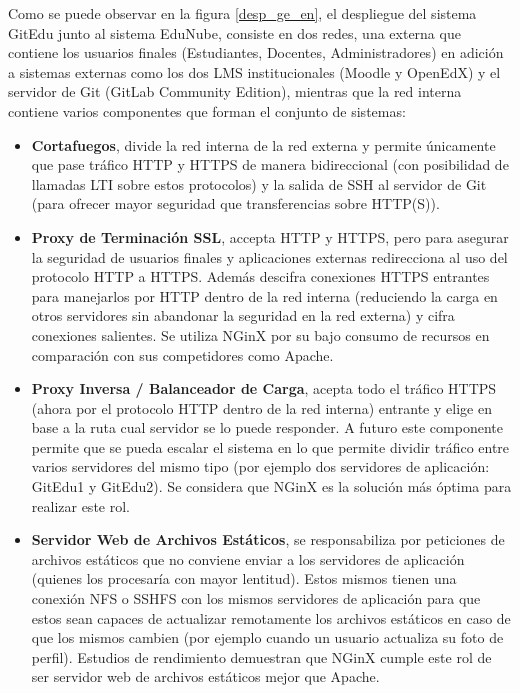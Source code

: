 Como se puede observar en la figura \ref{desp_ge_en}, el despliegue del sistema GitEdu junto al sistema EduNube, consiste en dos redes, una externa que contiene los usuarios finales (Estudiantes, Docentes, Administradores) en adición a sistemas externas como los dos LMS  institucionales (Moodle y OpenEdX) y el servidor de Git (GitLab Community Edition), mientras que la red interna contiene varios componentes que forman el conjunto de sistemas:
\begin{itemize}
	\item \textbf{Cortafuegos}, divide la red interna de la red externa y permite únicamente que pase tráfico HTTP y HTTPS de manera bidireccional (con posibilidad de llamadas LTI  sobre estos protocolos) y la salida de SSH al servidor de Git (para ofrecer mayor seguridad que transferencias sobre HTTP(S)).
    \item \textbf{Proxy de Terminación SSL}, accepta HTTP y HTTPS, pero para asegurar la seguridad de usuarios finales y aplicaciones externas redirecciona al uso del protocolo HTTP a HTTPS. Además descifra conexiones HTTPS entrantes para manejarlos por HTTP dentro de la red interna (reduciendo la carga en otros servidores sin abandonar la seguridad en la red externa) y cifra conexiones salientes. Se utiliza NGinX por su bajo consumo de recursos en comparación con sus competidores como Apache.
    \item \textbf{Proxy Inversa / Balanceador de Carga}, acepta todo el tráfico HTTPS (ahora por el protocolo HTTP dentro de la red interna) entrante y elige en base a la ruta cual servidor se lo puede responder. A futuro este componente permite que se pueda escalar el sistema en lo que permite dividir tráfico entre varios servidores del mismo tipo (por ejemplo dos servidores de aplicación: GitEdu1 y GitEdu2). Se considera que NGinX es la solución más óptima para realizar este rol.
    \item \textbf{Servidor Web de Archivos Estáticos}, se responsabiliza por peticiones de archivos estáticos que no conviene enviar a los servidores de aplicación (quienes los procesaría con mayor lentitud). Estos mismos tienen una conexión NFS o SSHFS con los mismos servidores de aplicación para que estos sean capaces de actualizar remotamente los archivos estáticos en caso de que los mismos cambien (por ejemplo cuando un usuario actualiza su foto de perfil). Estudios de rendimiento demuestran que NGinX cumple este rol de ser servidor web de archivos estáticos mejor que Apache.
     

\end{itemize}
